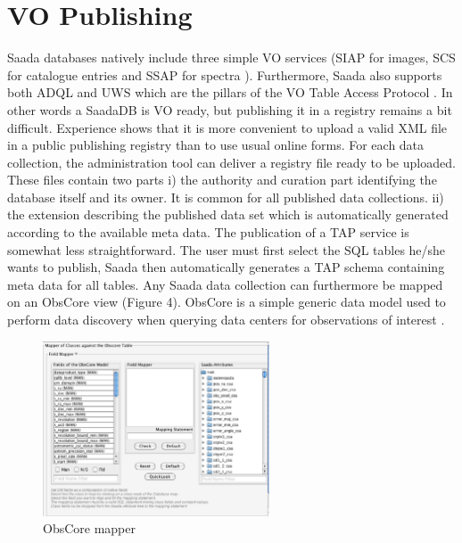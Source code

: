 \section{VO Publishing}
Saada databases natively include three simple VO services (SIAP for images, SCS for catalogue entries and SSAP for spectra \citep{SIAP,SCS,SSAP} ). Furthermore, Saada also supports both ADQL \citep{ADQL} and UWS \citep{UWS} which are the pillars of the VO Table Access Protocol \citep{TAP} .
In other words a SaadaDB is VO ready, but publishing it in a registry \citep{REG} remains a bit difficult. Experience shows that it is more convenient to upload a valid XML file in a public publishing registry than to use usual online forms. For each data collection, the administration tool can deliver a registry file ready to be uploaded. These files contain two parts i) the authority and curation part identifying the database itself and its owner. It is common for all published data collections. ii) the extension describing the published data set which is automatically generated according to the available meta data.
The publication of a TAP service is somewhat less straightforward. The user must first select the SQL tables he/she wants to publish, Saada then automatically generates a TAP schema containing meta data for all tables. 
Any Saada data collection can furthermore be mapped on an ObsCore view (Figure 4). ObsCore  is a simple generic data model used to perform data discovery when querying data centers for observations of interest \citep{OBSCORE}.

\begin{figure}[!h]
	\begin{center}
		\includegraphics[width=0.60\textwidth]{part8/MICHEL_P18/P18_fig4.eps}
	\end{center}
	\caption{ObsCore mapper}
	\label{fig:fig4}
\end{figure}

